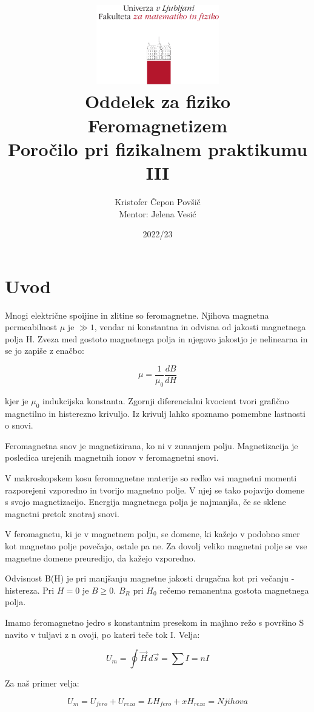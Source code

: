\documentclass[12pt]{report}
\title{
  \includegraphics[width=0.4\textwidth]{fmf_logo}\\
  {\small Oddelek za fiziko} \\
  {Feromagnetizem}\\
  {\small Poročilo pri fizikalnem praktikumu III}\\

}
\date{2022/23}
\author{ Kristofer Čepon Povšič \\[5 cm]
 \small  Mentor: Jelena Vesić
}
\begin{document}
\setcounter{page}{2}

\maketitle

\chapter*{Uvod}

Mnogi električne spoijine in zlitine so feromagnetne. Njihova magnetna permeabilnost $\mu$ je $\gg 1$, vendar ni konstantna in odvisna od jakosti magnetnega polja H. Zveza med gostoto magnetnega polja in njegovo jakostjo je nelinearna in se jo zapiše z enačbo: 

\begin{equation}
  \mu = \frac{1}{\mu_0}\frac{dB}{dH}
\end{equation}

kjer je $\mu_0$ indukcijska konstanta. Zgornji diferencialni kvocient tvori grafično magnetilno in histerezno krivuljo. Iz krivulj lahko spoznamo pomembne lastnosti o snovi. 

Feromagnetna snov je magnetizirana, ko ni v zunanjem polju. Magnetizacija je posledica urejenih magnetnih ionov v feromagnetni snovi. 

V makroskopskem kosu feromagnetne materije so redko vsi magnetni momenti razporejeni vzporedno in tvorijo magnetno polje. V njej se tako pojavijo domene s svojo magnetizacijo. Energija magnetnega polja je najmanjša, če se sklene magnetni pretok znotraj snovi. 

V feromagnetu, ki je v magnetnem polju, se domene, ki kažejo v podobno smer kot magnetno polje povečajo, ostale pa ne. Za dovolj veliko magnetni polje se vse magnetne domene preuredijo, da kažejo vzporedno. 

Odvisnost B(H) je pri manjšanju magnetne jakosti drugačna kot pri večanju - histereza. Pri $H=0$ je $B \geq 0$. $B_R$ pri $H_0$ rečemo remanentna gostota magnetnega polja. 

Imamo feromagnetno jedro s konstantnim presekom in majhno režo s površino S navito v tuljavi z n ovoji, po kateri teče tok I. Velja: 

\begin{equation}
  U_m = \oint \vec{H} \,d\vec{s} = \sum I = n I
\end{equation}

Za naš primer velja: 

\begin{equation}
  U_m = U_{fero} + U_{reza} = LH_{fero} + xH_{reza} = Njihova
\end{equation}
\end{document}
